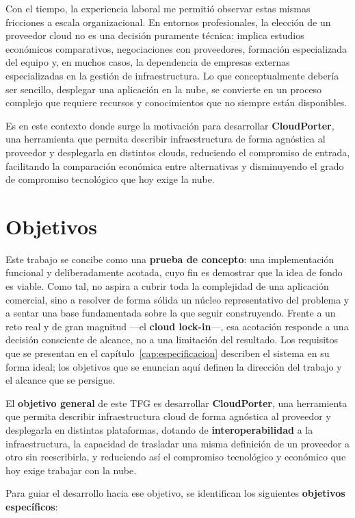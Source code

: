 Con el tiempo, la experiencia laboral me permitió observar estas mismas fricciones
a escala organizacional. En entornos profesionales, la elección de un proveedor cloud
no es una decisión puramente técnica: implica estudios económicos comparativos,
negociaciones con proveedores, formación especializada del equipo y, en muchos
casos, la dependencia de empresas externas especializadas en la gestión de
infraestructura. Lo que conceptualmente debería ser sencillo, desplegar una
aplicación en la nube, se convierte en un proceso complejo que requiere recursos
y conocimientos que no siempre están disponibles.

Es en este contexto donde surge la motivación para desarrollar \textbf{CloudPorter},
una herramienta que permita describir infraestructura de forma agnóstica al
proveedor y desplegarla en distintos clouds, reduciendo el compromiso de entrada,
facilitando la comparación económica entre alternativas y disminuyendo el grado
de compromiso tecnológico que hoy exige la nube.

\section{Objetivos}

Este trabajo se concibe como una \textbf{prueba de concepto}: una implementación
funcional y deliberadamente acotada, cuyo fin es demostrar que la idea de fondo es
viable. Como tal, no aspira a cubrir toda la complejidad de una aplicación comercial,
sino a resolver de forma sólida un núcleo representativo del problema y a sentar una
base fundamentada sobre la que seguir construyendo. Frente a un reto real y de gran
magnitud —el \textbf{cloud lock-in}—, esa acotación responde a una decisión consciente
de alcance, no a una limitación del resultado. Los requisitos que se presentan en el
capítulo~\ref{cap:especificacion} describen el sistema en su forma ideal; los objetivos
que se enuncian aquí definen la dirección del trabajo y el alcance que se persigue.

El \textbf{objetivo general} de este TFG es desarrollar \textbf{CloudPorter}, una
herramienta que permita describir infraestructura cloud de forma agnóstica al
proveedor y desplegarla en distintas plataformas, dotando de \textbf{interoperabilidad}
a la infraestructura, la capacidad de trasladar una misma definición de un proveedor a
otro sin reescribirla, y reduciendo así el compromiso tecnológico y económico que hoy
exige trabajar con la nube.

Para guiar el desarrollo hacia ese objetivo, se identifican los siguientes
\textbf{objetivos específicos}:

